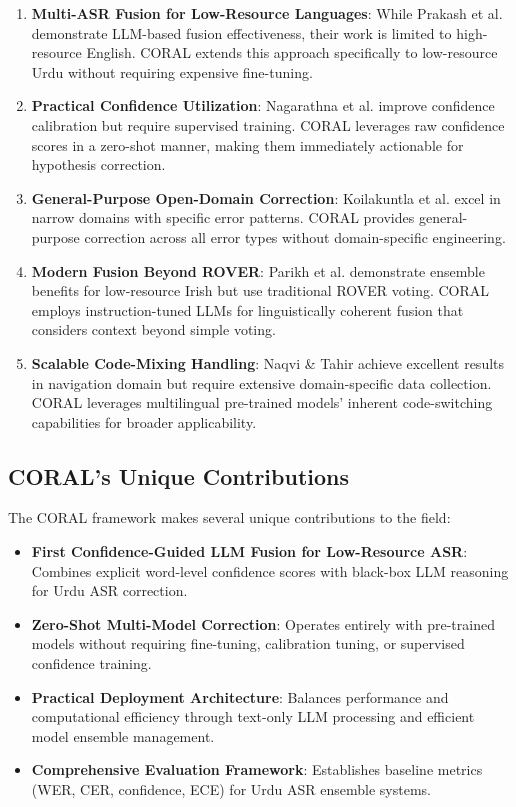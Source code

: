 \begin{enumerate}
    \item \textbf{Multi-ASR Fusion for Low-Resource Languages}: While Prakash et al. demonstrate LLM-based fusion effectiveness, their work is limited to high-resource English. CORAL extends this approach specifically to low-resource Urdu without requiring expensive fine-tuning.
    
    \item \textbf{Practical Confidence Utilization}: Nagarathna et al. improve confidence calibration but require supervised training. CORAL leverages raw confidence scores in a zero-shot manner, making them immediately actionable for hypothesis correction.
    
    \item \textbf{General-Purpose Open-Domain Correction}: Koilakuntla et al. excel in narrow domains with specific error patterns. CORAL provides general-purpose correction across all error types without domain-specific engineering.
    
    \item \textbf{Modern Fusion Beyond ROVER}: Parikh et al. demonstrate ensemble benefits for low-resource Irish but use traditional ROVER voting. CORAL employs instruction-tuned LLMs for linguistically coherent fusion that considers context beyond simple voting.
    
    \item \textbf{Scalable Code-Mixing Handling}: Naqvi \& Tahir achieve excellent results in navigation domain but require extensive domain-specific data collection. CORAL leverages multilingual pre-trained models' inherent code-switching capabilities for broader applicability.
\end{enumerate}

\subsection{CORAL's Unique Contributions}

The CORAL framework makes several unique contributions to the field:

\begin{itemize}
    \item \textbf{First Confidence-Guided LLM Fusion for Low-Resource ASR}: Combines explicit word-level confidence scores with black-box LLM reasoning for Urdu ASR correction.
    
    \item \textbf{Zero-Shot Multi-Model Correction}: Operates entirely with pre-trained models without requiring fine-tuning, calibration tuning, or supervised confidence training.
    
    \item \textbf{Practical Deployment Architecture}: Balances performance and computational efficiency through text-only LLM processing and efficient model ensemble management.
    
    \item \textbf{Comprehensive Evaluation Framework}: Establishes baseline metrics (WER, CER, confidence, ECE) for Urdu ASR ensemble systems.
\end{itemize}

